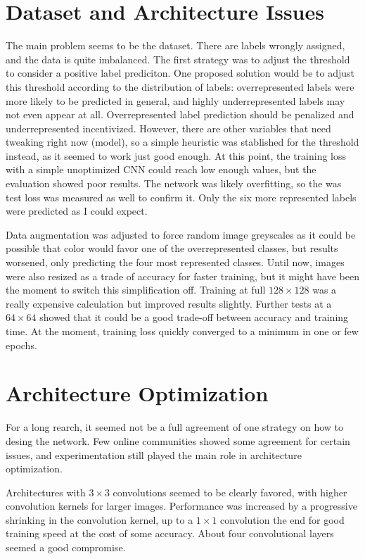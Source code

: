 \documentclass{article}
\begin{document}
\section{Dataset and Architecture Issues}
The main problem seems to be the dataset.
There are labels wrongly assigned, and the data is quite imbalanced.
The first strategy was to adjust the threshold to consider a positive label prediciton.
One proposed solution would be to adjust this threshold according to the distribution of labels: overrepresented labels were more likely to be predicted in general, and highly underrepresented labels may not even appear at all.
Overrepresented label prediction should be penalized and underrepresented incentivized.
However, there are other variables that need tweaking right now (model), so a simple heuristic was stablished for the threshold instead, as it seemed to work just good enough.
At this point, the training loss with a simple unoptimized CNN could reach low enough values, but the evaluation showed poor results.
The network was likely overfitting, so the was test loss was measured as well to confirm it.
Only the six more represented labels were predicted as I could expect.

Data augmentation was adjusted to force random image greyscales as it could be possible that color would favor one of the overrepresented classes, but results worsened, only predicting the four most represented classes.
Until now, images were also resized as a trade of accuracy for faster training, but it might have been the moment to switch this simplification off.
Training at full \(128 \times 128\) was a really expensive calculation but improved results slightly.
Further tests at a \(64 \times 64\) showed that it could be a good trade-off between accuracy and training time.
At the moment, training loss quickly converged to a minimum in one or few epochs.


\section{Architecture Optimization}
For a long rearch, it seemed not be a full agreement of one strategy on how to desing the network.
Few online communities showed some agreement for certain issues, and experimentation still played the main role in architecture optimization.

Architectures with \(3 \times 3\) convolutions seemed to be clearly favored, with higher convolution kernels for larger images.
Performance was increased by a progressive shrinking in the convolution kernel, up to a \(1 \times 1\) convolution the end for good training speed at the cost of some accuracy.
About four convolutional layers seemed a good compromise.
\end{document}
